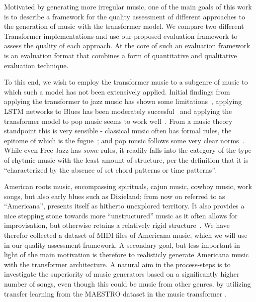\documentclass{IEEEtran}
\begin{document}
Motivated by generating more irregular music, one of the main goals of this
work is to describe a framework for the quality assessment of different
approaches to the generation of music with the transformer model. We compare
two different Transformer implementations and use our proposed evaluation
framework to assess the quality of each approach.
At the core of such an evaluation framework is  an evaluation format that
combines a form of quantitative and qualitative evaluation technique.

To this end, we wish to employ the transformer music to a subgenre of music
to which such a model has not been extensively applied. Initial findings from
applying the transformer to jazz music has shown some
limitations~\cite{wu2020jazz}, applying LSTM networks to Blues has been
moderately succesful~\cite{eck2002bluesLSTM} and applying the transformer
model to pop music seems to work well~\cite{huang2020pop}. From a music
theory standpoint this is very sensible - classical music often has formal
rules, the epitome of which is the fugue~\cite{giraud2015computational}; and
pop music follows some very clear norms~\cite{hennion1983production}. While
even Free Jazz has \emph{some} rules, it readily falls into the category of
the type of rhytmic music with the least amount of structure, per the
definition that it is ``characterized by the absence of set chord patterns or
time patterns''\cite{FreeJazz}.

American roots music, encompassing spirituals, cajun music, cowboy music,
work songs, but also early blues such as Dixieland; from now on referred to
as ``Americana'', presents itself as hitherto unexplored territory. It also
provides a nice stepping stone towards more ``unstructured'' music as it
often allows for improvisation, but otherwise retains a relatively rigid
structure~\cite{libcong}. We have therefor collected a dataset of MIDI files
of Americana music, which we will use in our quality assessment framework.
A secondary goal, but less important in light of the main motivation is
therefore to realisticly generate Americana music with the transformer
architecture. A natural aim in the process-steps is to investigate the
superiority of music generators based on a significantly higher number of
songs, even though this could be music from other genres, by utilizing
transfer learning from the MAESTRO dataset in the music transformer
\cite{huang2018music}.
\end{document}
